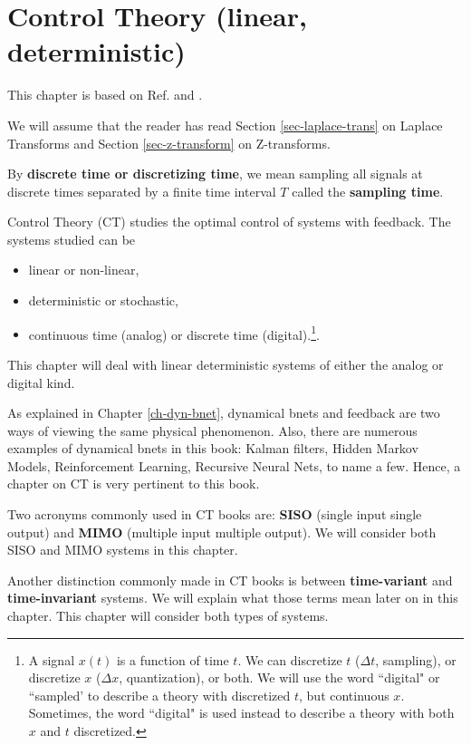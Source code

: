\chapter{Control Theory (linear, deterministic)}
\label{ch-control-th}

This chapter is
based on Ref.\cite{wikibooks-control-systems}
and \cite{wiki-signal-flow}.

We will assume that
the reader has read Section \ref{sec-laplace-trans}
on Laplace Transforms
and Section \ref{sec-z-transform}
on Z-transforms.

By {\bf discrete time or discretizing time}, we mean 
 sampling all signals
 at discrete times
 separated by a finite time
 interval $T$
 called the {\bf sampling time}.

Control Theory (CT)
studies the optimal
control of systems
with feedback. 
The systems studied can
be 
\begin{itemize}
\item linear or non-linear,
\item deterministic or stochastic,
\item continuous time (analog)
or
discrete time (digital).\footnote{A signal $x(t)$ is a function of time $t$.
We can discretize $t$ ($\Delta t$, sampling), or discretize 
$x$ ($\Delta x$, quantization),
or both. We will use the word
``digital" or ``sampled' to
describe a theory with discretized $t$,
but continuous $x$. 
Sometimes,
the word ``digital"
is used instead to describe
a theory with both $x$ and $t$ discretized.}.
\end{itemize}
This chapter will deal
with linear deterministic
systems of either 
the analog or digital kind.

As explained in Chapter
\ref{ch-dyn-bnet},
dynamical bnets and feedback
are two ways
of viewing the same 
physical phenomenon.
Also, there are numerous examples
of dynamical bnets in this book:
Kalman filters, Hidden Markov Models,
Reinforcement Learning,
Recursive Neural Nets, to name a few.
Hence, a chapter 
on CT is very 
pertinent to this book.

Two acronyms
commonly 
used in CT books
are:
{\bf SISO} (single input single output)
and
{\bf MIMO} (multiple input multiple output). We will consider both
SISO and MIMO systems in this chapter.

Another distinction
commonly
made in CT books
is between {\bf time-variant}
and {\bf time-invariant } systems.
We will explain what those terms
mean later on in this chapter.
This chapter will consider
both types of systems.



